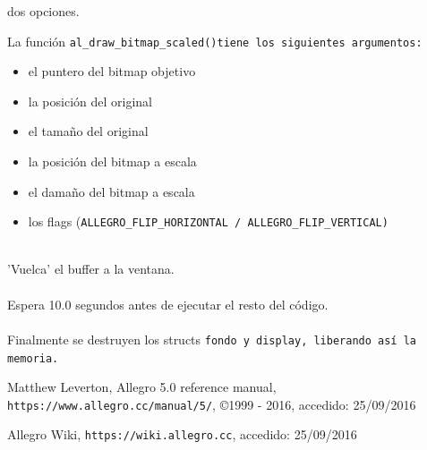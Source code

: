 \documentclass[11pt]{article}
\begin{document}
dos opciones.

La función \tt al\_draw\_bitmap\_scaled()\rm tiene los siguientes argumentos:
\begin{itemize}
\item el puntero del bitmap objetivo
\item la posición del original
\item el tamaño del original
\item la posición del bitmap a escala
\item el damaño del bitmap a escala
\item los flags (\tt ALLEGRO\_FLIP\_HORIZONTAL\rm \ / \tt ALLEGRO\_FLIP\_VERTICAL\rm)
\end{itemize}


\\

'Vuelca' el buffer a la ventana.\\

\\

Espera 10.0 segundos antes de ejecutar el resto del código.\\

\\

Finalmente se destruyen los structs \tt fondo \rm y \tt display\rm , liberando así la memoria.
\vfill
\begin{thebibliography}{9}
     Matthew Leverton, 
     Allegro 5.0 reference manual, 
     \verb!https://www.allegro.cc/manual/5/!, 
     \copyright 1999 - 2016,
     accedido: 25/09/2016
     
     Allegro Wiki,
     \verb!https://wiki.allegro.cc!,
     accedido: 25/09/2016
\end{thebibliography}
\end{document}
